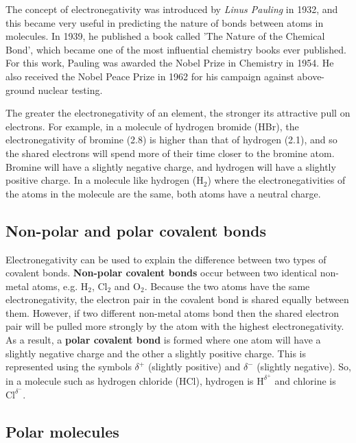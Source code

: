\begin{IFact}{
The concept of electronegativity was introduced by \textit{Linus Pauling} in 1932, and this became very useful in predicting the nature of bonds between atoms in molecules. In 1939, he published a book called 'The Nature of the Chemical Bond', which became one of the most influential chemistry books ever published. For this work, Pauling was awarded the Nobel Prize in Chemistry in 1954. He also received the Nobel Peace Prize in 1962 for his campaign against above-ground nuclear testing.
}
\end{IFact}

The greater the electronegativity of an element, the stronger its attractive pull on electrons. For example, in a molecule of hydrogen bromide (HBr), the electronegativity of bromine (2.8) is higher than that of hydrogen (2.1), and so the shared electrons will spend more of their time closer to the bromine atom. Bromine will have a slightly negative charge, and hydrogen will have a slightly positive charge. In a molecule like hydrogen (H$_{2}$) where the electronegativities of the atoms in the molecule are the same, both atoms have a neutral charge. \\

\subsection{Non-polar and polar covalent bonds}

Electronegativity can be used to explain the difference between two
types of covalent bonds. \textbf{Non-polar covalent bonds} occur between two
identical non-metal atoms, e.g.\@{} H$_2$, Cl$_2$ and O$_2$. Because the two atoms
have the same electronegativity, the electron pair in the covalent
bond is shared equally between them. However, if two different
non-metal atoms bond then the shared electron pair will be pulled more
strongly by the atom with the highest electronegativity. As a result, a \textbf{polar covalent bond} is formed where one atom will have a slightly negative charge and the other a slightly
positive charge. This is represented using the symbols $\delta^{+}$ (slightly positive) and $\delta^{-}$ (slightly negative). So, in a molecule such as hydrogen chloride (HCl), hydrogen is $\text{H}^{\delta^{+}}$ and chlorine is $\text{Cl}^{\delta^{-}}$.

\subsection{Polar molecules}

